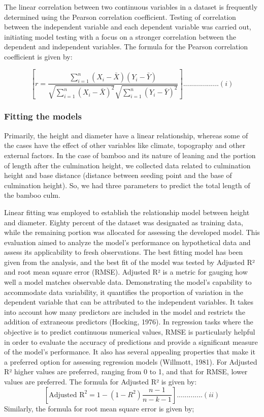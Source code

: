 \documentclass[preprint, 3p,
authoryear]{elsarticle} %
\begin{document}
The linear correlation between two continuous variables in a dataset is
frequently determined using the Pearson correlation coefficient. Testing
of correlation between the independent variable and each dependent
variable was carried out, initiating model testing with a focus on a
stronger correlation between the dependent and independent variables.
The formula for the Pearson correlation coefficient is given by:

\[[ r = \frac{{\sum_{i=1}^{n} (X_i - \bar{X})(Y_i - \bar{Y})}}{{\sqrt{\sum_{i=1}^{n} (X_i - \bar{X})^2} \sqrt{\sum_{i=1}^{n} (Y_i - \bar{Y})^2}}} ]..................                          (i)\]

\hypertarget{fitting-the-models}{%
\subsubsection{Fitting the models}\label{fitting-the-models}}

Primarily, the height and diameter have a linear relationship, whereas
some of the cases have the effect of other variables like climate,
topography and other external factors. In the case of bamboo and its
nature of leaning and the portion of length after the culmination
height, we collected data related to culmination height and base
distance (distance between seeding point and the base of culmination
height). So, we had three parameters to predict the total length of the
bamboo culm.

Linear fitting was employed to establish the relationship model between
height and diameter. Eighty percent of the dataset was designated as
training data, while the remaining portion was allocated for assessing
the developed model. This evaluation aimed to analyze the model's
performance on hypothetical data and assess its applicability to fresh
observations. The best fitting model has been given from the analysis,
and the best fit of the model was tested by Adjusted R² and root mean
square error (RMSE). Adjusted R² is a metric for gauging how well a
model matches observable data. Demonstrating the model's capability to
accommodate data variability, it quantifies the proportion of variation
in the dependent variable that can be attributed to the independent
variables. It takes into account how many predictors are included in the
model and restricts the addition of extraneous predictors (Hocking,
1976). In regression tasks where the objective is to predict continuous
numerical values, RMSE is particularly helpful in order to evaluate the
accuracy of predictions and provide a significant measure of the model's
performance. It also has several appealing properties that make it a
preferred option for assessing regression models (Willmott, 1981). For
Adjusted R² higher values are preferred, ranging from 0 to 1, and that
for RMSE, lower values are preferred. The formula for Adjusted R² is
given by:
\[[\text{Adjusted R}^2 = 1 - \left(1 - R^2\right) \frac{n - 1}{n - k - 1}].............(ii)\]
Similarly, the formula for root mean square error is given by;
\end{document}
